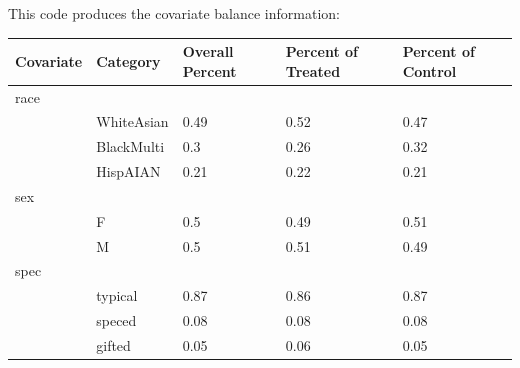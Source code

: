 \documentclass{article}
\begin{document}
This code produces the covariate balance information:
\begin{kframe}
\begin{alltt}
 \hlkwb{<-} 
  \hlstd{(}\hlstd{,}\hlstd{,}\hlstd{))\{}
     \hlkwb{<-} \hlstd{,}\hlstd{,}\hlstd{,}\hlstd{))}

      
         \hlkwb{<-} \hlstd{(}\hlstd{(}\hlstd{(}\hlopt{==}\hlstd{(dat[[i]][dat}\hlopt{$}\hlopt{==}\hlstd{]}\hlopt{==}\hlstd{(dat[[i]][dat}\hlopt{$}\hlopt{==}\hlstd{]}\hlopt{==}\hlstd{)))}

    \hlstd{\}}
\hlstd{\}}
 \hlkwb{<-} \hlstd{(}\hlstd{,}\hlstd{,}\hlstd{,}\hlstd{,}\hlstd{)}
\hlstd{(}\hlstd{=}\hlstd{,}\hlstd{=}\hlstd{)}
\end{alltt}
\end{kframe}%
\begin{tabular}{lllll}
  \hline
Covariate & Category & Overall Percent & Percent of Treated & Percent of Control \\ 
  \hline
race &  &  &  &  \\ 
   & WhiteAsian & 0.49 & 0.52 & 0.47 \\ 
   & BlackMulti & 0.3 & 0.26 & 0.32 \\ 
   & HispAIAN & 0.21 & 0.22 & 0.21 \\ 
  sex &  &  &  &  \\ 
   & F & 0.5 & 0.49 & 0.51 \\ 
   & M & 0.5 & 0.51 & 0.49 \\ 
  spec &  &  &  &  \\ 
   & typical & 0.87 & 0.86 & 0.87 \\ 
   & speced & 0.08 & 0.08 & 0.08 \\ 
   & gifted & 0.05 & 0.06 & 0.05 \\ 
   \hline
\end{tabular}
\end{document}
